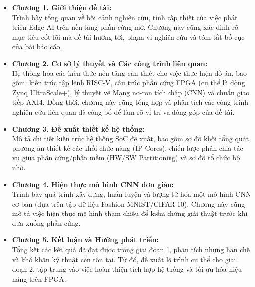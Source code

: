 \begin{itemize}
    \item \textbf{Chương 1. Giới thiệu đề tài:} \\
    Trình bày tổng quan về bối cảnh nghiên cứu, tính cấp thiết của việc phát triển Edge AI trên nền tảng phần cứng mở. Chương này cũng xác định rõ mục tiêu cốt lõi mà đề tài hướng tới, phạm vi nghiên cứu và tóm tắt bố cục của bài báo cáo.

    \item \textbf{Chương 2. Cơ sở lý thuyết và Các công trình liên quan:} \\
    Hệ thống hóa các kiến thức nền tảng cần thiết cho việc thực hiện đồ án, bao gồm: kiến trúc tập lệnh RISC-V, cấu trúc phần cứng FPGA (cụ thể là dòng Zynq UltraScale+), lý thuyết về Mạng nơ-ron tích chập (CNN) và chuẩn giao tiếp AXI4. Đồng thời, chương này cũng tổng hợp và phân tích các công trình nghiên cứu liên quan đã công bố để làm rõ vị trí và đóng góp của đề tài.

    \item \textbf{Chương 3. Đề xuất thiết kế hệ thống:} \\
    Mô tả chi tiết kiến trúc hệ thống SoC đề xuất, bao gồm sơ đồ khối tổng quát, phương án thiết kế các khối chức năng (IP Cores), chiến lược phân chia tác vụ giữa phần cứng/phần mềm (HW/SW Partitioning) và sơ đồ tổ chức bộ nhớ.

    \item \textbf{Chương 4. Hiện thực mô hình CNN đơn giản:} \\
    Trình bày quá trình xây dựng, huấn luyện và lượng tử hóa một mô hình CNN cơ bản (dựa trên tập dữ liệu Fashion-MNIST/CIFAR-10). Chương này cũng mô tả việc hiện thực mô hình tham chiếu để kiểm chứng giải thuật trước khi đưa xuống phần cứng.

    \item \textbf{Chương 5. Kết luận và Hướng phát triển:} \\
    Tổng kết các kết quả đã đạt được trong giai đoạn 1, phân tích những hạn chế và khó khăn kỹ thuật còn tồn tại. Từ đó, đề xuất lộ trình cụ thể cho giai đoạn 2, tập trung vào việc hoàn thiện tích hợp hệ thống và tối ưu hóa hiệu năng trên FPGA.
\end{itemize}